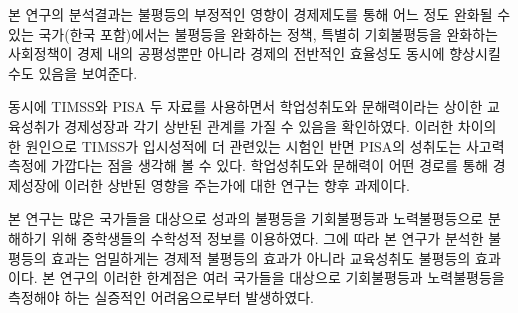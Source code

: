본 연구의 분석결과는 불평등의 부정적인 영향이 경제제도를 통해 어느 정도 완화될 수 있는 국가(한국 포함)에서는 불평등을 완화하는 정책, 특별히 기회불평등을 완화하는 사회정책이 경제 내의 공평성뿐만 아니라 경제의 전반적인 효율성도 동시에 향상시킬 수도 있음을 보여준다.

동시에 TIMSS와 PISA 두 자료를 사용하면서 학업성취도와 문해력이라는 상이한 교육성취가 경제성장과 각기 상반된 관계를 가질 수 있음을 확인하였다.
이러한 차이의 한 원인으로 TIMSS가 입시성적에 더 관련있는 시험인 반면 PISA의 성취도는 사고력 측정에 가깝다는 점을 생각해 볼 수 있다.
학업성취도와 문해력이 어떤 경로를 통해 경제성장에 이러한 상반된 영향을 주는가에 대한 연구는 향후 과제이다.

본 연구는 많은 국가들을 대상으로 성과의 불평등을 기회불평등과 노력불평등으로 분해하기 위해 중학생들의 수학성적 정보를 이용하였다.
그에 따라 본 연구가 분석한 불평등의 효과는 엄밀하게는 경제적 불평등의 효과가 아니라 교육성취도 불평등의 효과이다.
본 연구의 이러한 한계점은 여러 국가들을 대상으로 기회불평등과 노력불평등을 측정해야 하는 실증적인 어려움으로부터 발생하였다.
